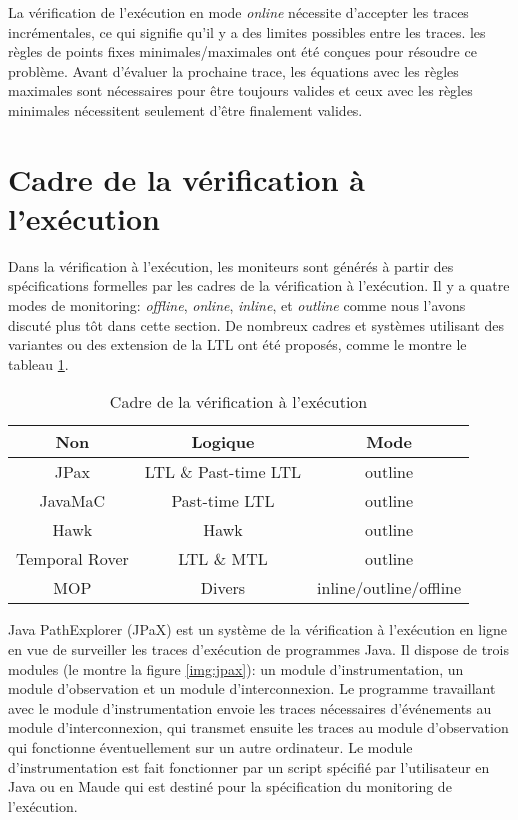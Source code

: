 La vérification de l'exécution en mode \emph{online} nécessite d'accepter les traces incrémentales, ce qui signifie qu'il y a des limites possibles entre les traces. les règles de points fixes minimales/maximales ont été conçues pour résoudre ce problème. Avant d'évaluer la prochaine trace, les équations avec les règles maximales sont nécessaires pour être toujours valides et ceux avec les règles minimales nécessitent seulement d'être finalement valides.

\section{Cadre de la vérification à l'exécution}\label{sec:rv:frameworks}

Dans la vérification à l'exécution, les moniteurs sont générés à partir des spécifications formelles par les cadres de la vérification à l'exécution. Il y a quatre modes de monitoring: \emph{offline}, \emph{online}, \emph{inline}, et \emph{outline} comme nous l'avons discuté plus tôt dans cette section. De nombreux cadres et systèmes utilisant des variantes ou des extension de la LTL ont été proposés, comme le montre le tableau \ref{table:rvframeworks}.

\begin{table}[h]
\centering
\begin{tabular}{|c|c|c|}
\hline
Non & Logique & Mode \\
\hline
JPax\citep{havelund2001java} & LTL \& Past-time LTL & outline \\
\hline
JavaMaC\citep{kim2004java} & Past-time LTL & outline \\
\hline
Hawk \citep{d2005event} & Hawk & outline \\
\hline
Temporal Rover\citep{drusinsky2000temporal} & LTL \& MTL & outline \\
\hline
MOP \citep{chen2007mop} & Divers & inline/outline/offline \\
\hline
\end{tabular}
\caption{Cadre de la vérification à l'exécution}
\label{table:rvframeworks}
\end{table}

Java PathExplorer (JPaX) \citep{havelund2001java} est un système de la vérification à l'exécution en ligne en vue de surveiller les traces d'exécution de programmes Java. Il dispose de trois modules (le montre la figure \ref{img:jpax}): un module d'instrumentation, un module d'observation et un module d'interconnexion. Le programme travaillant avec le module d'instrumentation envoie les traces nécessaires d'événements au module d'interconnexion, qui transmet ensuite les traces au module d'observation qui fonctionne éventuellement sur un autre ordinateur. Le module d'instrumentation est fait fonctionner par un script spécifié par l'utilisateur en Java ou en Maude qui est destiné pour la spécification du monitoring de l'exécution.

